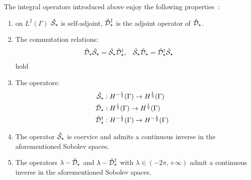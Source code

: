 \begin{lemma}
  The integral operators introduced above enjoy the following
  properties~\autocite{Hsiao2008-xb, Sauter2011-an}:
  \begin{enumerate}
      \item on $L^2(\Gamma)$ $\hat{\mathcal{S}}_\star$ is self-adjoint,
        $\hat{\mathcal{D}}^\dagger_\star$ is the adjoint operator of
        $\hat{\mathcal{D}}_\star$.
      \item The commutation relations:
        \begin{alignat}{2}
          \hat{\mathcal{D}}_\star\hat{\mathcal{S}}_\star = \hat{\mathcal{S}}_\star\hat{\mathcal{D}}^\dagger_\star, \quad&
          \hat{\mathcal{S}}_\star\hat{\mathcal{D}}_\star = \hat{\mathcal{D}}^\dagger_\star\hat{\mathcal{S}}_\star
        \end{alignat}
        hold
      \item The operators:
        \begin{subequations}
          \begin{align}
   \hat{\mathcal{S}}_\star &: H^{-\frac{1}{2}}(\Gamma) \rightarrow H^{\frac{1}{2}}(\Gamma) \\
   \hat{\mathcal{D}}_\star &: H^{\frac{1}{2}}(\Gamma) \rightarrow H^{\frac{1}{2}}(\Gamma) \\
   \hat{\mathcal{D}}^\dagger_\star &: H^{-\frac{1}{2}}(\Gamma) \rightarrow H^{-\frac{1}{2}}(\Gamma)
          \end{align}
        \end{subequations}
      \item The operator $\hat{\mathcal{S}}_\star$ is coervice and admits a
        continuous inverse in the aforementioned Sobolev spaces.
      \item The operators $\lambda - \hat{\mathcal{D}}_\star$ and $\lambda -
        \hat{\mathcal{D}}^\dagger_\star$ with $\lambda \in (-2\pi, +\infty)$
        admit a continuous inverse in the aforementioned
        Sobolev spaces.
  \end{enumerate}
\end{lemma}

